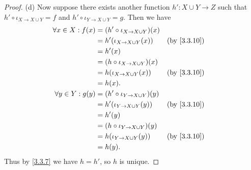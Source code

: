 \begin{proof}{(d)}
  Now suppose there exists another function \(h' : X \cup Y \to Z\) such that \(h' \circ \iota_{X \to X \cup Y} = f\) and \(h' \circ \iota_{Y \to X \cup Y} = g\).
  Then we have
  \begin{align*}
    \forall x \in X : f(x) & = (h' \circ \iota_{X \to X \cup Y})(x)                  \\
                           & = h'(\iota_{X \to X \cup Y}(x))        &  & \by{3.3.10} \\
                           & = h'(x)                                                 \\
                           & = (h \circ \iota_{X \to X \cup Y})(x)                   \\
                           & = h(\iota_{X \to X \cup Y}(x))         &  & \by{3.3.10} \\
                           & = h(x).                                                 \\
    \forall y \in Y : g(y) & = (h' \circ \iota_{Y \to X \cup Y})(y)                  \\
                           & = h'(\iota_{Y \to X \cup Y}(y))        &  & \by{3.3.10} \\
                           & = h'(y)                                                 \\
                           & = (h \circ \iota_{Y \to X \cup Y})(y)                   \\
                           & = h(\iota_{Y \to X \cup Y}(y))         &  & \by{3.3.10} \\
                           & = h(y).
  \end{align*}
  Thus by \cref{3.3.7} we have \(h = h'\), so \(h\) is unique.
\end{proof}